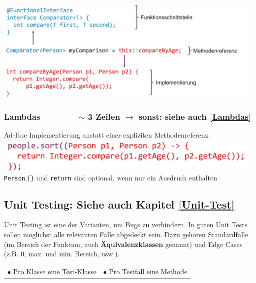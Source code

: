 {    \includegraphics[width=\linewidth]{pictures/methoden-referenzen.jpg}
    \vspace{-0.2cm} 


    \subsubsection{Lambdas $\qquad \qquad$ $\sim$ 3 Zeilen $\rightarrow$ sonst: siehe auch \ref{Lambdas}}
        Ad-Hoc Implementierung anstatt einer expliziten Methodenreferenz. \\
        \includegraphics[width=\linewidth-2cm]{pictures/lambda.jpg} \\
        \verb|Person|,\verb|{}| und \verb|return| sind optional, wenn nur ein Ausdruck enthalten
        \vspace{-0.1cm} 

\subsection{Unit Testing: Siehe auch Kapitel \ref{Unit-Test}}
    Unit Testing ist eine der Varianten, um Bugs zu verhindern. In guten Unit Tests sollen möglichst alle relevanten Fälle abgedeckt sein.
    Dazu gehören Standardfälle (im Bereich der Funktion, auch \textbf{Äquivalenzklassen} genannt) und Edge Cases (z.B. 0, max. und min. Bereich, usw.).\\
    \vspace{-0.3cm}

    \begin{tabular}{l l}
        $\bullet$ Pro Klasse eine Test-Klasse & $\bullet$ Pro Testfall eine Methode\\
    \end{tabular}
    \vspace{-0.3cm}

}
